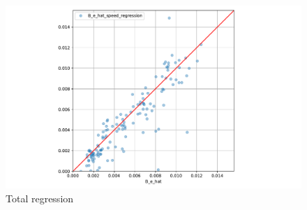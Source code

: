 \begin{figure}[H]
    \centering
    \includegraphics[width=\columnwidth]{figures/B_e_factor_regression_total.pdf}
    \caption{Total regression}
    \label{fig:B_e_factor_regression_total}
\end{figure}


